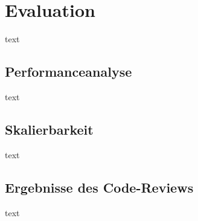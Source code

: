 \section{Evaluation}
text
\subsection{Performanceanalyse}
text
\subsection{Skalierbarkeit}
text
\subsection{Ergebnisse des Code-Reviews}
text